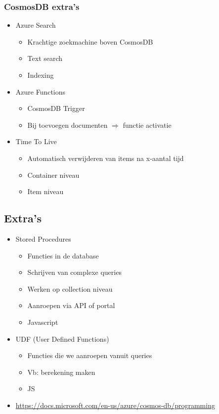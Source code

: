 \documentclass{article}
\begin{document}
\subsubsection{CosmosDB extra's}

\begin{itemize}
    \item Azure Search
    \begin{itemize}
        \item Krachtige zoekmachine boven CosmosDB
        \item Text search
        \item Indexing
    \end{itemize}
    \item Azure Functions
    \begin{itemize}
        \item CosmosDB Trigger
        \item Bij toevoegen documenten $\Rightarrow$ functie activatie
    \end{itemize}
    \item Time To Live
    \begin{itemize}
        \item Automatisch verwijderen van items na x-aantal tijd
        \item Container niveau
        \item Item niveau
    \end{itemize}
\end{itemize}

\subsection{Extra's}

\begin{itemize}
    \item Stored Procedures
    \begin{itemize}
        \item Functies in de database
        \item Schrijven van complexe queries
        \item Werken op collection niveau
        \item Aanroepen via API of portal
        \item Javascript
    \end{itemize}
    \item UDF (User Defined Functions)
    \begin{itemize}
        \item Functies die we aanroepen vanuit queries
        \item Vb: berekening maken
        \item JS
    \end{itemize}
    \item \url{https://docs.microsoft.com/en-us/azure/cosmos-db/programming}
\end{itemize}
\end{document}
